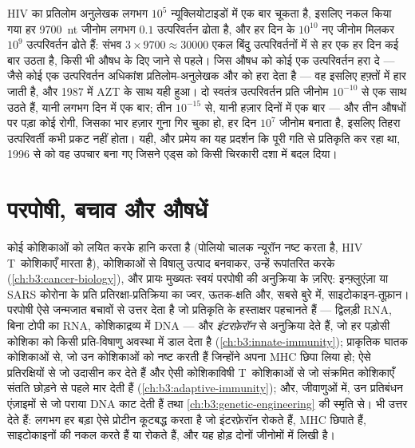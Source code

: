 \begin{example}\label{ex:b3:virology:three-drugs}
HIV का प्रतिलोम अनुलेखक लगभग $10^{5}$ न्यूक्लियोटाइडों में एक बार चूकता
है, इसलिए नकल किया गया हर \qty{9700}{nt} जीनोम लगभग $0.1$ उत्परिवर्तन
ढोता है, और हर दिन के $10^{10}$ नए जीनोम मिलकर $10^{9}$ उत्परिवर्तन ढोते
हैं: संभव $3\times 9700 \approx \num{30000}$ एकल बिंदु
उत्परिवर्तनों में से हर एक हर दिन कई बार उठता है, किसी भी औषध के दिए
जाने से पहले। जिस औषध को कोई एक उत्परिवर्तन हरा दे --- जैसे कोई एक
उत्परिवर्तन अधिकांश प्रतिलोम-अनुलेखक और  को हरा देता
है --- वह इसलिए हफ़्तों में हार जाती है, और 1987 में AZT के साथ यही
हुआ। दो स्वतंत्र उत्परिवर्तन प्रति जीनोम $10^{-10}$ से एक साथ उठते हैं,
यानी लगभग दिन में एक बार; तीन $10^{-15}$ से, यानी हज़ार दिनों में एक
बार --- और तीन औषधों पर पड़ा कोई रोगी, जिसका भार हज़ार गुना गिर चुका
हो, हर दिन $10^{7}$ जीनोम बनाता है, इसलिए तिहरा उत्परिवर्ती कभी प्रकट
नहीं होता। यही, और प्रमेय का यह प्रदर्शन कि  पूरी गति से
प्रतिकृति कर रहा था, 1996 से  को वह उपचार बना गए जिसने
एड्स को किसी चिरकारी दशा में बदल दिया।
\end{example}

\section{परपोषी, बचाव और औषधें}

\begin{proposition}[रोगजनन और बचाव]\label{prop:b3:virology:pathogenesis}
कोई  कोशिकाओं को लयित करके हानि करता है (पोलियो चालक न्यूरॉन नष्ट
करता है, HIV T~कोशिकाएँ मारता है), कोशिकाओं से विषालु उत्पाद बनवाकर,
उन्हें रूपांतरित करके (\cref{ch:b3:cancer-biology}), और प्रायः मुख्यतः
स्वयं परपोषी की अनुक्रिया के ज़रिए: इन्फ़्लुएंज़ा या SARS कोरोना 
के प्रति प्रतिरक्षा-प्रतिक्रिया का ज्वर, ऊतक-क्षति और, सबसे बुरे में,
साइटोकाइन-तूफ़ान। परपोषी ऐसे जन्मजात बचावों से उत्तर देता है जो 
प्रतिकृति के हस्ताक्षर पहचानते हैं --- द्विलड़ी RNA, बिना टोपी का RNA,
कोशिकाद्रव्य में DNA --- और \emph{इंटरफ़ेरॉन} से अनुक्रिया देते हैं, जो
हर पड़ोसी कोशिका को किसी प्रति-विषाणु अवस्था में डाल देता है
(\cref{ch:b3:innate-immunity}); प्राकृतिक घातक कोशिकाओं से, जो उन
कोशिकाओं को नष्ट करती हैं जिन्होंने अपना MHC छिपा लिया हो; ऐसे
प्रतिरक्षियों से जो  उदासीन कर देते हैं और ऐसी कोशिकाविषी
T~कोशिकाओं से जो संक्रमित कोशिकाएँ संतति छोड़ने से पहले मार देती हैं
(\cref{ch:b3:adaptive-immunity}); और, जीवाणुओं में, उन प्रतिबंधन
एंज़ाइमों से जो पराया DNA काट देती हैं तथा
\cref{ch:b3:genetic-engineering} की  स्मृति से।  भी उत्तर
देते हैं: लगभग हर बड़ा  ऐसे प्रोटीन कूटबद्ध करता है जो इंटरफ़ेरॉन
रोकते हैं, MHC छिपाते हैं, साइटोकाइनों की नकल करते हैं या 
रोकते हैं, और यह होड़ दोनों जीनोमों में लिखी है।
\end{proposition}

